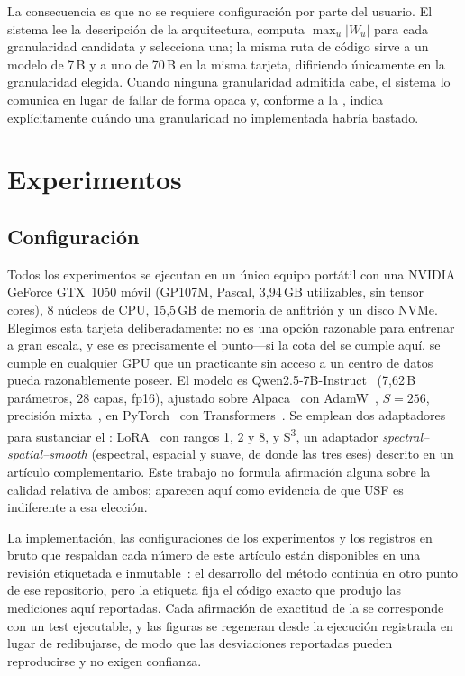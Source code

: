 \documentclass[journal]{IEEEtran}
\newcommand{\usf}{USF}
\newcommand{\Wu}{\lvert W_u \rvert}
\newcommand{\sthree}{S\textsuperscript{3}}
\begin{document}
La consecuencia es que no se requiere configuración por parte del usuario. El sistema lee la
descripción de la arquitectura, computa $\max_u \Wu$ para cada granularidad candidata y selecciona
una; la misma ruta de código sirve a un modelo de 7\,B y a uno de 70\,B en la misma tarjeta,
difiriendo únicamente en la granularidad elegida. Cuando ninguna granularidad admitida cabe, el
sistema lo comunica en lugar de fallar de forma opaca y, conforme a la ,
indica explícitamente cuándo una granularidad no implementada habría bastado.

\section{Experimentos}
\label{sec:exp}

\subsection{Configuración}

Todos los experimentos se ejecutan en un único equipo portátil con una NVIDIA GeForce GTX~1050
móvil (GP107M, Pascal, 3,94\,GB utilizables, sin tensor cores), 8 núcleos de CPU, 15,5\,GB de
memoria de anfitrión y un disco NVMe. Elegimos esta tarjeta deliberadamente: no es una opción
razonable para entrenar a gran escala, y ese es precisamente el punto---si la cota del
 se cumple aquí, se cumple en cualquier GPU que un practicante sin acceso a un
centro de datos pueda razonablemente poseer. El
modelo es Qwen2.5-7B-Instruct~\cite{qwen2025} (7,62\,B parámetros, 28 capas, fp16), ajustado sobre
Alpaca~\cite{alpaca2023} con AdamW~\cite{loshchilov2019adamw}, $S=256$, precisión
mixta~\cite{micikevicius2018mixed}, en PyTorch~\cite{paszke2019pytorch} con
Transformers~\cite{wolf2020transformers}. Se emplean dos adaptadores para sustanciar el
: LoRA~\cite{hu2022lora} con rangos 1, 2 y 8, y \sthree{}, un adaptador
\emph{spectral--spatial--smooth} (espectral, espacial y suave, de donde las tres eses) descrito en
un artículo complementario. Este trabajo no formula
afirmación alguna sobre la calidad relativa de ambos; aparecen aquí como evidencia de que \usf{} es
indiferente a esa elección.

La implementación, las configuraciones de los experimentos y los registros en bruto que respaldan
cada número de este artículo están disponibles en una revisión etiquetada e
inmutable~\cite{usfcode}: el desarrollo del método continúa en otro punto de ese repositorio, pero
la etiqueta fija el código exacto que produjo las mediciones aquí reportadas. Cada afirmación de
exactitud de la  se corresponde con un test ejecutable, y las figuras se regeneran
desde la ejecución registrada en lugar de redibujarse, de modo que las desviaciones reportadas
pueden reproducirse y no exigen confianza.
\end{document}
